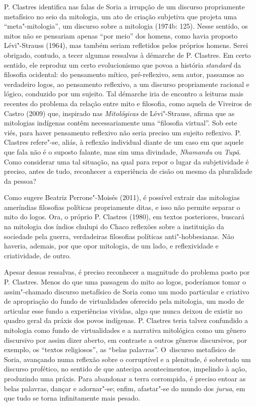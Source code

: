 P. Clastres identifica nas falas de Soria a irrupção de um discurso
propriamente metafísico no seio da mitologia, um ato de criação
subjetiva que projeta uma ``meta"-mitologia'', um discurso sobre a
mitologia (1974b: 125). Nesse sentido, os mitos não se pensariam apenas
``por meio'' dos homens, como havia proposto Lévi"-Strauss (1964), mas
também seriam refletidos pelos próprios homens. Serei obrigado,
contudo, a tecer algumas ressalvas à démarche de P. Clastres. Em certo
sentido, ele reproduz um certo evolucionismo que povoa a história
\emph{standard} da filosofia ocidental: do pensamento mítico, pré-reflexivo,
sem autor, passamos ao verdadeiro logos, ao pensamento reflexivo, a um
discurso propriamente racional e lógico, conduzido por um sujeito. Tal
démarche iria de encontro a leituras mais recentes do problema da
relação entre mito e filosofia, como aquela de Viveiros de Castro
(2009) que, inspirado nas \emph{Mitológicas} de Lévi"-Strauss, afirma que as
mitologias indígenas contêm necessariamente uma ``filosofia virtual''.
Sob este viés, para haver pensamento reflexivo não seria preciso um
sujeito reflexivo. P. Clastres refere"-se, aliás, à reflexão individual
diante de um caso em que aquele que fala não é o suposto falante, mas
sim uma divindade, \emph{Nhamandu} ou \emph{Tupã}. Como considerar uma tal situação,
na qual para repor o lugar da subjetividade é preciso, antes de tudo,
reconhecer a experiência de cisão ou mesmo da pluralidade da pessoa?

Como sugere Beatriz Perrone"-Moisés (2011), é possível extrair das
mitologias ameríndias filosofias políticas propriamente ditas, e isso
não permite separar o mito do logos. Ora, o próprio P. Clastres (1980),
em textos posteriores, buscará na mitologia dos índios chulupi do Chaco
reflexões sobre a instituição da sociedade pela guerra, verdadeiras
filosofias políticas anti"-hobbesianas. Não haveria, ademais, por que opor
mitologia, de um lado, e reflexividade e criatividade, de outro.

Apesar dessas ressalvas, é preciso reconhecer a magnitude do problema
posto por P. Clastres. Menos do que uma passagem do mito ao logos,
poderíamos tomar o assim"-chamado discurso metafísico de Soria como um
modo particular e criativo de apropriação do fundo de virtualidades
oferecido pela mitologia, um modo de articular esse fundo a
experiências vividas, algo que nunca deixou de existir no quadro geral
da práxis dos povos indígenas. P. Clastres teria talvez confundido a
mitologia como fundo de virtualidades e a narrativa mitológica como um
gênero discursivo por assim dizer aberto, em contraste a outros gêneros
discursivos, por exemplo, os ``textos religiosos'', as ``belas palavras''.
O~discurso metafísico de Soria, avançando numa reflexão sobre o
corruptível e a plenitude, é sobretudo um discurso profético, no
sentido de que antecipa acontecimentos, impelindo à ação, produzindo
uma práxis. Para abandonar a terra corrompida, é preciso entoar as
belas palavras, dançar e adornar"-se; enfim, afastar"-se do mundo dos
\emph{jurua}, em que tudo se torna infinitamente mais pesado. 

